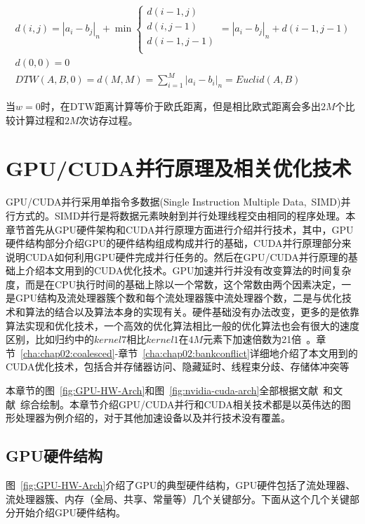 \begin{equation}
\label{equ:chap2:dtwdeg2euclid1}
\begin{array}{l}
d(i,j) = |a_i-b_j|_n + \min
\begin{cases}
d(i-1,j)\\
d(i,j-1)\\
d(i-1,j-1)\\
\end{cases} = |a_i-b_j|_n + d(i-1,j-1)
\\[0.2cm]
d(0,0)=0 \\[0.2cm]
DTW(A,B,0) = d(M,M) = \sum_{i=1}^{M}|a_i-b_i|_n = Euclid(A,B)
\end{array}
\end{equation}

当$w=0$时，在DTW距离计算等价于欧氏距离，但是相比欧式距离会多出$2M$个比较计算过程和$2M$次访存过程。

\section{GPU/CUDA并行原理及相关优化技术}
\label{cha:chap03:gpu-HW-Arch}

GPU/CUDA并行采用单指令多数据(Single Instruction Multiple Data,~SIMD)并行方式的。SIMD并行是将数据元素映射到并行处理线程交由相同的程序处理。本章节首先从GPU硬件架构和CUDA并行原理方面进行介绍并行技术，其中，GPU硬件结构部分介绍GPU的硬件结构组成构成并行的基础，CUDA并行原理部分来说明CUDA如何利用GPU硬件完成并行任务的。然后在GPU/CUDA并行原理的基础上介绍本文用到的CUDA优化技术。GPU加速并行并没有改变算法的时间复杂度，而是在CPU执行时间的基础上除以一个常数，这个常数由两个因素决定，一是GPU结构及流处理器簇个数和每个流处理器簇中流处理器个数，二是与优化技术和算法的结合以及算法本身的实现有关。硬件基础没有办法改变，更多的是依靠算法实现和优化技术，一个高效的优化算法相比一般的优化算法也会有很大的速度区别，比如归约中的$kernel7$相比$kernel1$在$4M$元素下加速倍数为21倍~\cite{harris2007optimizing}。章节~\ref{cha:chap02:coalesced}-章节~\ref{cha:chap02:bankconflict}详细地介绍了本文用到的CUDA优化技术，包括合并存储器访问、隐藏延时、线程束分歧、存储体冲突等

本章节的图~\ref{fig:GPU-HW-Arch}和图~\ref{fig:nvidia-cuda-arch}全部根据文献~\cite{nickolls2009graphics}和文献~\cite{lippert2009nvidia}综合绘制。本章节介绍GPU/CUDA并行和CUDA相关技术都是以英伟达的图形处理器为例介绍的，对于其他加速设备以及并行技术没有覆盖。
\subsection{GPU硬件结构}
\label{cha:chap03:gpu-Hw}
图~\ref{fig:GPU-HW-Arch}介绍了GPU的典型硬件结构，GPU硬件包括了流处理器、流处理器簇、内存（全局、共享、常量等）几个关键部分。下面从这个几个关键部分开始介绍GPU硬件结构。

